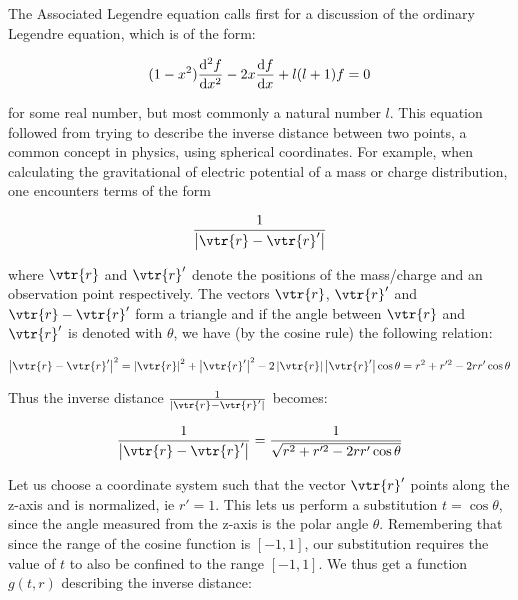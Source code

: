 \documentclass{article}
\begin{document}
    The Associated Legendre equation calls first for a discussion of the ordinary Legendre equation, which is of the form:

    \begin{equation}
        \label{eq:legendre}
        (1 - x^2)\odv[order = 2]{f}{x} - 2x\odv{f}{x} + l(l + 1)f = 0
    \end{equation}

    for some real number, but most commonly a natural number $l$. This equation followed from trying to describe the inverse distance between two points, a common concept in physics, using
    spherical coordinates. For example, when calculating the gravitational of electric potential of a mass or charge distribution, one encounters terms of the form

    \begin{equation}
        \frac{1}{\left|\vtr{r} - \vtr{r}'\right|}
    \end{equation}

    where $\vtr{r}$ and $\vtr{r}'$ denote the positions of the mass/charge and an observation point respectively. The vectors $\vtr{r}$, $\vtr{r}'$ and $\vtr{r} - \vtr{r}'$ form a triangle and
    if the angle between $\vtr{r}$ and $\vtr{r}'$ is denoted with $\theta$, we have (by the cosine rule) the following relation:

    \begin{equation}
        \left|\vtr{r} - \vtr{r}'\right|^2 = \left|\vtr{r}\right|^2 + \left|\vtr{r}'\right|^2 - 2\left| \vtr{r} \right|\left| \vtr{r}' \right|\cos\theta = r^2 + r'^2 - 2rr'\cos\theta
    \end{equation}

    Thus the inverse distance $\frac{1}{\left| \vtr{r} - \vtr{r}' \right|}$ becomes:

    \begin{equation}
        \frac{1}{\left| \vtr{r} - \vtr{r}' \right|} = \frac{1}{\sqrt{r^2 + r'^2 - 2rr'\cos\theta}}
    \end{equation}

    Let us choose a coordinate system such that the vector $\vtr{r}'$ points along the z-axis and is normalized, ie $r' = 1$. This lets us perform a substitution $t = \cos\theta$, since the angle measured
    from the z-axis is the polar angle $\theta$. Remembering that since the range of the cosine function is $[-1, 1]$, our substitution requires the value of $t$ to also be confined to the range $[-1, 1]$.
    We thus get a function $g(t, r)$ describing the inverse distance:
\end{document}
